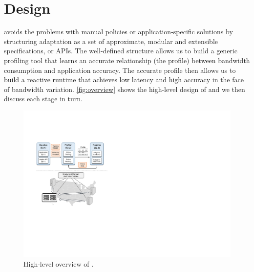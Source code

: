 \section{\sysname{} Design}
\label{sec:system}

\sysname{} avoids the problems with manual policies or application-specific
solutions by structuring adaptation as a set of approximate, modular and
extensible specifications, or APIs. The well-defined structure allows us to
build a generic profiling tool that learns an accurate relationship (the
profile) between bandwidth consumption and application accuracy. The accurate
profile then allows us to build a reactive runtime that achieves low latency and
high accuracy in the face of bandwidth variation. \autoref{fig:overview} shows
the high-level design of \sysname{} and we then discuss each stage in turn.

\begin{figure}
  \centering
  \includegraphics[width=.9\linewidth]{figures/system.pdf}
  \caption{High-level overview of \sysname{}.}
  \label{fig:overview}
\end{figure}





\newpage

